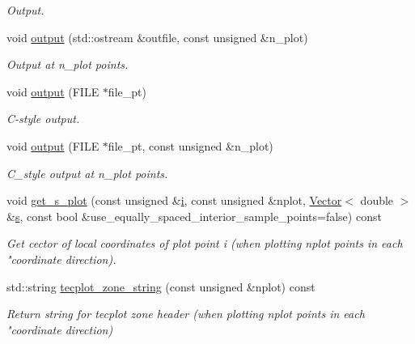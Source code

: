 \begin{DoxyCompactItemize}
\begin{DoxyCompactList}\small\item\em Output. \end{DoxyCompactList}\item 
void \hyperlink{classoomph_1_1QElement_3_011_00_01NNODE__1D_01_4_a19fb7fd1e4def7132018d2aa0e6c00d7}{output} (std\+::ostream \&outfile, const unsigned \&n\+\_\+plot)
\begin{DoxyCompactList}\small\item\em Output at n\+\_\+plot points. \end{DoxyCompactList}\item 
void \hyperlink{classoomph_1_1QElement_3_011_00_01NNODE__1D_01_4_a54d62722411a1b5361718aa95f6c4e70}{output} (F\+I\+LE $\ast$file\+\_\+pt)
\begin{DoxyCompactList}\small\item\em C-\/style output. \end{DoxyCompactList}\item 
void \hyperlink{classoomph_1_1QElement_3_011_00_01NNODE__1D_01_4_a5ba26a038a5a26e6873753fb78cd6a5c}{output} (F\+I\+LE $\ast$file\+\_\+pt, const unsigned \&n\+\_\+plot)
\begin{DoxyCompactList}\small\item\em C\+\_\+style output at n\+\_\+plot points. \end{DoxyCompactList}\item 
void \hyperlink{classoomph_1_1QElement_3_011_00_01NNODE__1D_01_4_ae29d39b63e194b5b43c2741e0188a780}{get\+\_\+s\+\_\+plot} (const unsigned \&\hyperlink{cfortran_8h_adb50e893b86b3e55e751a42eab3cba82}{i}, const unsigned \&nplot, \hyperlink{classoomph_1_1Vector}{Vector}$<$ double $>$ \&\hyperlink{cfortran_8h_ab7123126e4885ef647dd9c6e3807a21c}{s}, const bool \&use\+\_\+equally\+\_\+spaced\+\_\+interior\+\_\+sample\+\_\+points=false) const
\begin{DoxyCompactList}\small\item\em Get cector of local coordinates of plot point i (when plotting nplot points in each "coordinate direction). \end{DoxyCompactList}\item 
std\+::string \hyperlink{classoomph_1_1QElement_3_011_00_01NNODE__1D_01_4_a0bc7e12731ff23a747a6a8ba5bdc712e}{tecplot\+\_\+zone\+\_\+string} (const unsigned \&nplot) const
\begin{DoxyCompactList}\small\item\em Return string for tecplot zone header (when plotting nplot points in each "coordinate direction) \end{DoxyCompactList}\item 

\end{DoxyCompactItemize}
